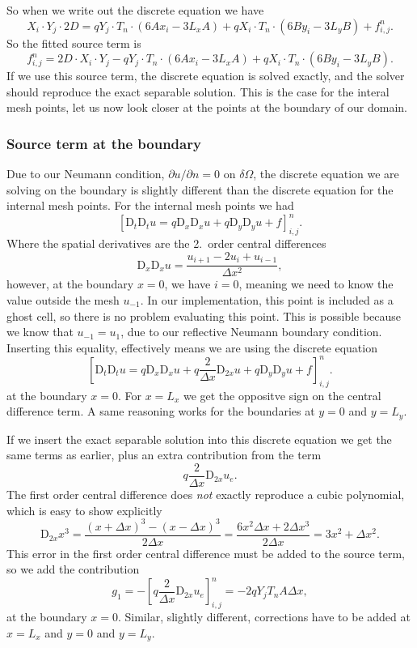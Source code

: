 \documentclass[a4paper, 11pt, notitlepage, english]{article}
\newcommand{\p}{\partial}
\newcommand{\D}{\mbox{D}}
\begin{document}
So when we write out the discrete equation we have
$$X_i \cdot Y_j \cdot 2D = q Y_j \cdot T_n \cdot(6Ax_i - 3L_x A) + qX_i\cdot T_n \cdot(6By_i - 3L_y B) + f_{i,j}^n.$$
So the fitted source term is
$$f_{i,j}^n = 2D\cdot X_i\cdot Y_j - q Y_j \cdot T_n \cdot(6Ax_i - 3L_xA) + qX_i\cdot T_n \cdot(6By_i - 3L_yB).$$
If we use this source term, the discrete equation is solved exactly, and the solver should reproduce the exact separable solution. This is the case for the interal mesh points, let us now look closer at the points at the boundary of our domain.

\subsubsection*{Source term at the boundary}

Due to our Neumann condition, $\p u/\p n = 0$ on $\delta \Omega$, the discrete equation we are solving on the boundary is slightly different than the discrete equation for the internal mesh points. For the internal mesh points we had
$$[\D_t\D_t u = q \D_x \D_x u + q \D_y \D_y u + f]^{n}_{i,j}.$$
Where the spatial derivatives are the 2.\ order central differences
$$\D_x \D_x u = \frac{u_{i+1} - 2u_i + u_{i-1}}{\Delta x^2},$$
however, at the boundary $x = 0$, we have $i=0$, meaning we need to know the value outside the mesh $u_{-1}$. In our implementation, this point is included as a ghost cell, so there is no problem evaluating this point. This is possible because we know that $u_{-1} = u_{1}$, due to our reflective Neumann boundary condition. Inserting this equality, effectively means we are using the discrete equation
$$[\D_t\D_t u = q \D_x \D_x u + q\frac{2}{\Delta x} \D_{2x}u +  q \D_y \D_y u + f]^{n}_{i,j}.$$
at the boundary $x = 0$. For $x=L_x$ we get the oppositve sign on the central difference term. A same reasoning works for the boundaries at $y=0$ and $y=L_y$.

If we insert the exact separable solution into this discrete equation we get the same terms as earlier, plus an extra contribution from the term
$$q\frac{2}{\Delta x} \D_{2x} u_e.$$
The first order central difference does \emph{not} exactly reproduce a cubic polynomial, which is easy to show explicitly
$$\D_{2x} x^3 = \frac{(x+\Delta x)^3 - (x-\Delta x)^3}{2\Delta x} = \frac{6x^2\Delta x + 2\Delta x^3}{2\Delta x} = 3x^2 + \Delta x^2.$$
This error in the first order central difference must be added to the source term, so we add the contribution
$$g_1 = -[q\frac{2}{\Delta x} \D_{2x} u_e]_{i,j}^n = -2qY_jT_n A \Delta x,$$
at the boundary $x = 0$. Similar, slightly different, corrections have to be added at $x=L_x$ and $y=0$ and $y=L_y$.
\end{document}
